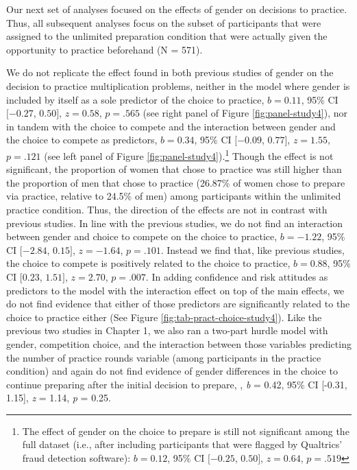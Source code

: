 \documentclass[a4paper, nobind]{templates/ociamthesis}
\begin{document}
Our next set of analyses focused on the effects of gender on decisions to practice. Thus, all subsequent analyses focus on the subset of participants that were assigned to the unlimited preparation condition that were actually given the opportunity to practice beforehand (N = 571).

We do not replicate the effect found in both previous studies of gender on the decision to practice multiplication problems, neither in the model where gender is included by itself as a sole predictor of the choice to practice, \(b = 0.11\), 95\% CI \([-0.27\), \(0.50]\), \(z = 0.58\), \(p = .565\) (see right panel of Figure \ref{fig:panel-study4}), nor in tandem with the choice to compete and the interaction between gender and the choice to compete as predictors, \(b = 0.34\), 95\% CI \([-0.09\), \(0.77]\), \(z = 1.55\), \(p = .121\) (see left panel of Figure \ref{fig:panel-study4}).\footnote{The effect of gender on the choice to prepare is still not significant among the full dataset (i.e., after including participants that were flagged by Qualtrics' fraud detection software): \(b = 0.12\), 95\% CI \([-0.25\), \(0.50]\), \(z = 0.64\), \(p = .519\)} Though the effect is not significant, the proportion of women that chose to practice was still higher than the proportion of men that chose to practice (26.87\% of women chose to prepare via practice, relative to 24.5\% of men) among participants within the unlimited practice condition. Thus, the direction of the effects are not in contrast with previous studies. In line with the previous studies, we do not find an interaction between gender and choice to compete on the choice to practice, \(b = -1.22\), 95\% CI \([-2.84\), \(0.15]\), \(z = -1.64\), \(p = .101\). Instead we find that, like previous studies, the choice to compete is positively related to the choice to practice, \(b = 0.88\), 95\% CI \([0.23\), \(1.51]\), \(z = 2.70\), \(p = .007\). In adding confidence and risk attitudes as predictors to the model with the interaction effect on top of the main effects, we do not find evidence that either of those predictors are significantly related to the choice to practice either (See Figure \ref{fig:tab-pract-choice-study4}). Like the previous two studies in Chapter 1, we also ran a two-part hurdle model with gender, competition choice, and the interaction between those variables predicting the number of practice rounds variable (among participants in the practice condition) and again do not find evidence of gender differences in the choice to continue preparing after the initial decision to prepare, , \emph{b} = 0.42, 95\% CI {[}-0.31, 1.15{]}, \emph{z} = 1.14, \emph{p} = 0.25.\\
\end{document}
